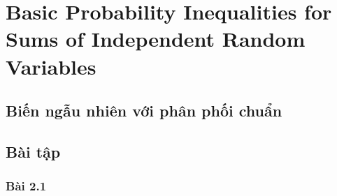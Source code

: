 \chapter{Basic Probability Inequalities for Sums of
Independent Random Variables}

\section{Biến ngẫu nhiên với phân phối chuẩn}

\section{Bài tập}

\subsection{Bài 2.1}





